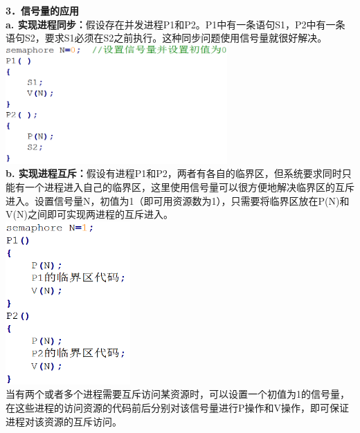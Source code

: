 \textbf{{3．信号量的应用}}{~}\textbf{{\\
}a.
实现进程同步：}假设存在并发进程P1和P2。P1中有一条语句S1，P2中有一条语句S2，要求S1必须在S2之前执行。这种同步问题使用信号量就很好解决。\\
\includegraphics[width=3.33333in,height=1.79167in]{png-jpeg-pics/385B9D2BDF1FE32401CBDE9F621AB128.png}\\
\textbf{b.
实现进程互斥：}假设有进程P1和P2，两者有各自的临界区，但系统要求同时只能有一个进程进入自己的临界区，这里使用信号量可以很方便地解决临界区的互斥进入。设置信号量N，初值为1（即可用资源数为1），只需要将临界区放在P(N)和V(N)之间即可实现两进程的互斥进入。\\
\includegraphics[width=1.87500in,height=2.45833in]{png-jpeg-pics/2DAFB1FCA7C1D490F4A0BD65E410DE83.png}\\

当有两个或者多个进程需要互斥访问某资源时，可以设置一个初值为1的信号量，在这些进程的访问资源的代码前后分别对该信号量进行P操作和V操作，即可保证进程对该资源的互斥访问。

